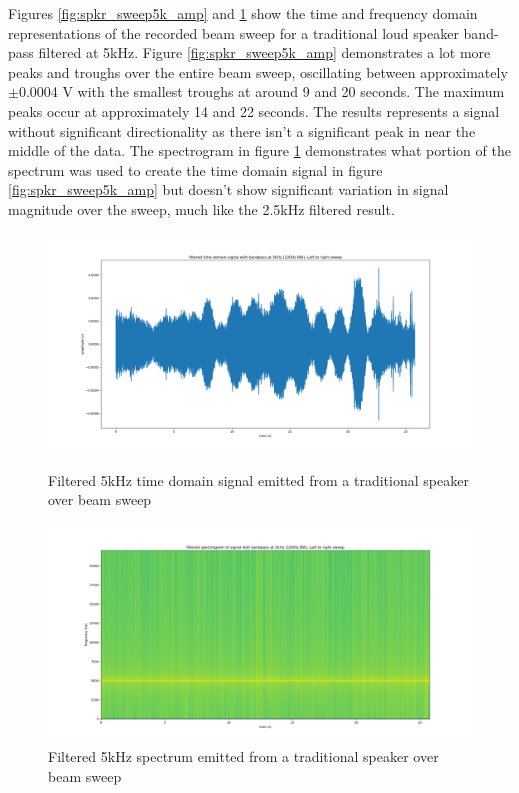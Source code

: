 Figures \ref{fig:spkr_sweep5k_amp} and \ref{fig:spkr_sweep5k_spectro} show the time and frequency domain representations of the recorded beam sweep for a traditional loud speaker band-pass filtered at 5kHz. Figure \ref{fig:spkr_sweep5k_amp} demonstrates a lot more peaks and troughs over the entire beam sweep, oscillating between approximately $\pm$0.0004 V with the smallest troughs at around 9 and 20 seconds. The maximum peaks occur at approximately 14 and 22 seconds. The results represents a signal without significant directionality as there isn't a significant peak in near the middle of the data. The spectrogram in figure \ref{fig:spkr_sweep5k_spectro} demonstrates what portion of the spectrum was used to create the time domain signal in figure \ref{fig:spkr_sweep5k_amp} but doesn't show significant variation in signal magnitude over the sweep, much like the 2.5kHz filtered result.
\begin{figure}[ht!]
    \centering
    \begin{minipage}{0.49\textwidth}
        \centering
        \includegraphics[width=\textwidth]{Figures/Testing/BeamSweep/Classical_speaker/5k_amp_sweep_spkr.png}
        \caption{Filtered 5kHz time domain signal emitted from a traditional speaker over beam sweep}
        \label{fig:spkr_sweep5k_amp}
    \end{minipage}\hfill
    \begin{minipage}{0.49\textwidth}
        \centering
        \includegraphics[width=\textwidth]{Figures/Testing/BeamSweep/Classical_speaker/5k_freq_sweep_spkr.png}
        \caption{Filtered 5kHz spectrum emitted from a traditional speaker over beam sweep}
        \label{fig:spkr_sweep5k_spectro}
    \end{minipage}
\end{figure}

